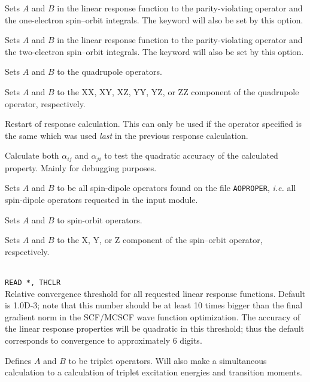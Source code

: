 \begin{description}
\item{} Sets $A$ and $B$ in the linear response function
  to the parity-violating operator and the one-electron spin--orbit
  integrals. The  keyword will
  also be set by this option.

\item{} Sets $A$ and $B$ in the linear response function
  to the parity-violating operator and the two-electron spin--orbit
  integrals. The  keyword will
  also be set by this option.

\item{}
Sets $A$ and $B$ to the quadrupole operators.

\item{}
Sets $A$ and $B$ to the XX, XY, XZ, YY, YZ, or ZZ component of the
quadrupole operator, respectively.

\item{}
Restart of response calculation. This
can only be used if the
operator specified is the same which was used \textit{last} in the previous
response calculation.

\item{} Calculate both $\alpha_{ij}$ and $\alpha_{ji}$ to
  test the quadratic accuracy of the calculated property. Mainly for
  debugging purposes.

\item{} Sets $A$ and $B$ to be all spin-dipole operators
  found on the file \verb|AOPROPER|, {\it i.e.\/} all spin-dipole
  operators requested in the  input module.

\item{}
Sets $A$ and $B$ to spin-orbit operators.

\item{}
Sets $A$ and $B$ to the X, Y, or Z component of the spin--orbit
operator, respectively.

\item{}\\
\verb|READ *, THCLR|\\
Relative convergence threshold for all requested linear response functions.
Default is 1.0D-3; note that this number should be at least 10 times
bigger than the final gradient norm in the SCF/MCSCF
wave function optimization. The accuracy of the linear response
properties will be quadratic in this threshold; thus the default
corresponds to convergence to approximately 6 digits.

\item{} Defines $A$ and $B$ to be triplet operators.
Will also make a simultaneous   calculation to
a calculation of triplet excitation energies and transition moments.


\end{description}

